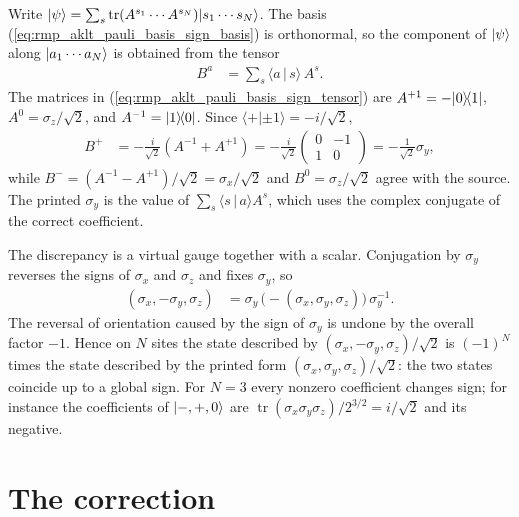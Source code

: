 \documentclass{article}
\begin{document}
Write $|\psi\rangle=\sum_{s}\operatorname{tr}(A^{s_1}\cdots A^{s_N})
|s_1\cdots s_N\rangle$. The basis
(\ref{eq:rmp_aklt_pauli_basis_sign_basis}) is orthonormal, so the component of
$|\psi\rangle$ along $|a_1\cdots a_N\rangle$ is obtained from the tensor
\begin{align}
    B^{a}
        &=\sum_{s}\langle a\,|\,s\rangle\,A^{s}.
    \label{eq:rmp_aklt_pauli_basis_sign_new_tensor}
\end{align}
The matrices in (\ref{eq:rmp_aklt_pauli_basis_sign_tensor}) are
$A^{+1}=-|0\rangle\!\langle 1|$, $A^{0}=\sigma_z/\sqrt2$, and
$A^{-1}=|1\rangle\!\langle 0|$. Since $\langle +|\pm1\rangle=-i/\sqrt2$,
\begin{align}
    B^{+}
        &=-\frac{i}{\sqrt2}\left(A^{-1}+A^{+1}\right)
        =-\frac{i}{\sqrt2}\begin{pmatrix}0&-1\\1&0\end{pmatrix}
        =-\frac{1}{\sqrt2}\sigma_y,
    \label{eq:rmp_aklt_pauli_basis_sign_plus}
\end{align}
while $B^-=(A^{-1}-A^{+1})/\sqrt2=\sigma_x/\sqrt2$ and
$B^0=\sigma_z/\sqrt2$ agree with the source. The printed $\sigma_y$ is the
value of $\sum_s\langle s\,|\,a\rangle A^s$, which uses the complex conjugate
of the correct coefficient.

The discrepancy is a virtual gauge together with a scalar. Conjugation by
$\sigma_y$ reverses the signs of $\sigma_x$ and $\sigma_z$ and fixes
$\sigma_y$, so
\begin{align}
    (\sigma_x,-\sigma_y,\sigma_z)
        &=\sigma_y\,\big(-(\sigma_x,\sigma_y,\sigma_z)\big)\,\sigma_y^{-1}.
    \label{eq:rmp_aklt_pauli_basis_sign_gauge}
\end{align}
The reversal of orientation caused by the sign of $\sigma_y$ is undone by
the overall factor $-1$. Hence on $N$ sites the state described by
$(\sigma_x,-\sigma_y,\sigma_z)/\sqrt2$ is $(-1)^N$ times the state described
by the printed form $(\sigma_x,\sigma_y,\sigma_z)/\sqrt2$: the two states
coincide up to a global sign. For $N=3$ every nonzero coefficient changes
sign; for instance the coefficients of $|-,+,0\rangle$ are
$\operatorname{tr}(\sigma_x\sigma_y\sigma_z)/2^{3/2}=i/\sqrt2$ and its
negative.

\section{The correction}
\end{document}

